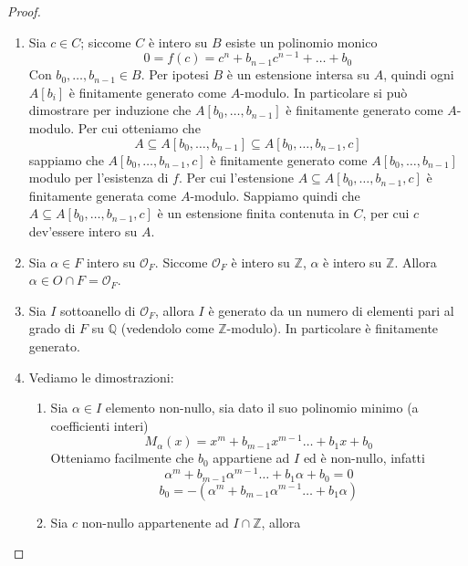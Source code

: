 \begin{proof}\
	\begin{enumerate}
		\item Sia $c\in C$; siccome $C$ è intero su $B$ esiste un polinomio monico
		\begin{equation*}
			0 = f(c) = c^n + b_{n-1}c^{n-1} + \dots + b_0
		\end{equation*}
		Con $b_0, \dots, b_{n-1}\in B$. Per ipotesi $B$ è un estensione intersa su $A$, quindi 
		ogni $A[b_i]$ è finitamente generato come $A$-modulo. In particolare si può dimostrare
		per induzione che $A[b_0, \dots, b_{n-1}]$ è finitamente generato come $A$-modulo. 
		Per cui otteniamo che 
		\begin{equation*}
			A \subseteq A[b_0, \dots, b_{n-1}] \subseteq A[b_0, \dots, b_{n-1}, c]
		\end{equation*} 
		sappiamo che $A[b_0, \dots, b_{n-1},c]$ è finitamente generato come $A[b_0, \dots, b_{n-1}]$
		modulo per l'esistenza di $f$. Per cui l'estensione $A \subseteq A[b_0, \dots, b_{n-1},c]$ è 
		finitamente generata come $A$-modulo. Sappiamo quindi che 
		$A \subseteq A[b_0, \dots, b_{n-1},c]$ è un estensione finita contenuta in $C$, per cui $c$ 
		dev'essere intero su $A$.
		\item Sia $\alpha\in F$ intero su $\mathcal{O}_F$. Siccome $\mathcal{O}_F$ è intero su $\mathbb{Z}$, $\alpha$ è intero su $\mathbb{Z}$. Allora $\alpha\in O\cap F=\mathcal{O}_F$.
		\item Sia $I$ sottoanello di $\mathcal{O}_F$, allora $I$ è generato da un numero di elementi pari al grado di $F$ su $\mathbb{Q}$ (vedendolo come $\mathbb{Z}$-modulo). In particolare è finitamente generato.
		\item Vediamo le dimostrazioni:
		\begin{enumerate}
			\item Sia $\alpha\in I$ elemento non-nullo, sia dato il suo polinomio minimo (a coefficienti interi)
			\begin{equation*}
			M_\alpha(x)=x^m+b_{m-1}x^{m-1}\dots+b_1x+b_0
			\end{equation*}
			Otteniamo facilmente che $b_0$ appartiene ad $I$ ed è non-nullo, infatti
			\begin{equation*}
			\alpha^m+b_{m-1}\alpha^{m-1}\dots+b_1\alpha+b_0=0
			\end{equation*}
			\begin{equation*}
			b_0=-(\alpha^m+b_{m-1}\alpha^{m-1}\dots+b_1\alpha)
			\end{equation*}
			\item Sia $c$ non-nullo appartenente ad $I\cap\mathbb{Z}$, allora 

\end{enumerate}
\end{enumerate}
\end{proof}
